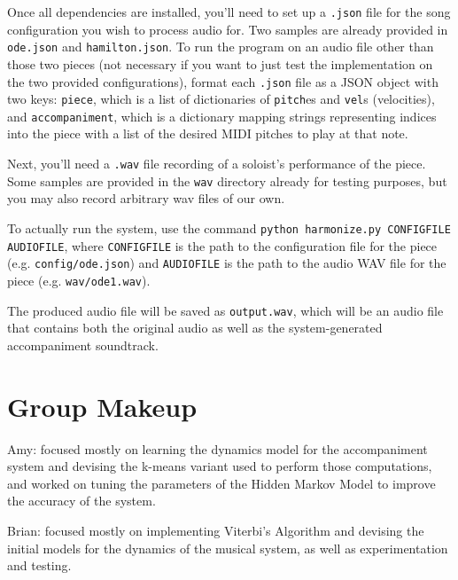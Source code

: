 \documentclass[11pt]{article}
\begin{document}
Once all dependencies are installed, you'll need to set up a \texttt{.json} file
for the song configuration you wish to process audio for. Two samples are already provided in
\texttt{ode.json} and \texttt{hamilton.json}. To run the program on an audio file other
than those two pieces (not necessary if you want to just test the implementation
on the two provided configurations),
format each \texttt{.json} file as a JSON object with two keys:
\texttt{piece}, which is a list of dictionaries of \texttt{pitch}es and \texttt{vel}s
(velocities), and \texttt{accompaniment}, which is a dictionary mapping strings
representing indices into the piece with a list of the desired MIDI pitches to play
at that note.

Next, you'll need a \texttt{.wav} file recording of a soloist's performance of the piece.
Some samples are provided in the \texttt{wav} directory already for testing purposes,
but you may also record arbitrary wav files of our own.

To actually run the system, use the command
\texttt{python harmonize.py CONFIGFILE AUDIOFILE}, where
\texttt{CONFIGFILE} is the path to the configuration file for the piece
(e.g. \texttt{config/ode.json})
and \texttt{AUDIOFILE} is the path to the audio WAV file for the piece
(e.g. \texttt{wav/ode1.wav}).

The produced audio file will be saved as \texttt{output.wav}, which will
be an audio file that contains both the original audio as well as the system-generated
accompaniment soundtrack.

\section{Group Makeup}

Amy: focused mostly on learning the dynamics model for the accompaniment
system and devising the k-means variant used to perform those computations,
and worked on tuning the parameters of the Hidden Markov Model to improve
the accuracy of the system.

Brian: focused mostly on implementing Viterbi's Algorithm and devising
the initial models for the dynamics of the musical system, as well as
experimentation and testing.



\end{document}
